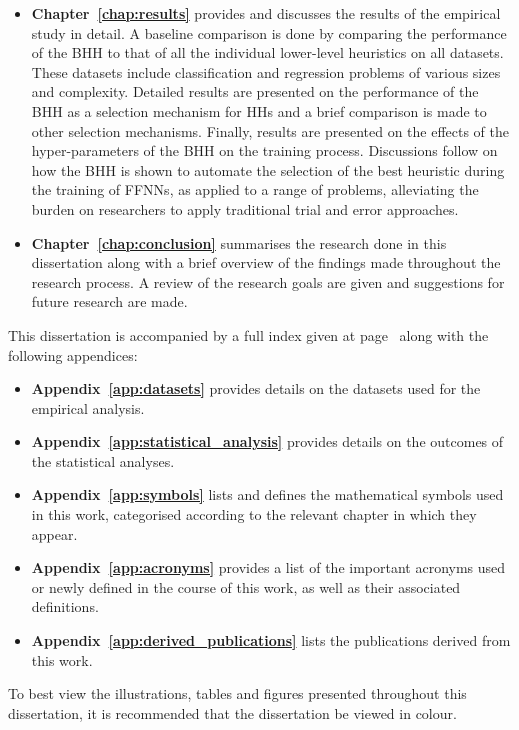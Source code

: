 \begin{itemize}
      \item \textbf{Chapter~\ref{chap:results}} provides and discusses the results of the empirical study in detail. A baseline comparison is done by comparing the performance of the \Acs{BHH} to that of all the individual lower-level heuristics on all datasets. These datasets include classification and regression problems of various sizes and complexity.  Detailed results are presented on the performance of the \Acs{BHH} as a selection mechanism for \acp{HH} and a brief comparison is made to other selection mechanisms. Finally, results are presented on the effects of the hyper-parameters of the \Acs{BHH} on the training process. Discussions follow on how the \Acs{BHH} is shown to automate the selection of the best heuristic during the training of \acp{FFNN}, as applied to a range of problems, alleviating the burden on researchers to apply traditional trial and error approaches.

      \item \textbf{Chapter~\ref{chap:conclusion}} summarises the research done in this dissertation along with a brief overview of the findings made throughout the research process. A review of the research goals are given and suggestions for future research are made.
\end{itemize}

This dissertation is accompanied by a full index given at page~\pageref{index} along with the following appendices:

\begin{itemize}
      \item \textbf{Appendix~\ref{app:datasets}} provides details on the datasets used for the empirical analysis.

      \item \textbf{Appendix~\ref{app:statistical_analysis}} provides details on the outcomes of the statistical analyses.

      \item \textbf{Appendix~\ref{app:symbols}} lists and defines the mathematical symbols used in this work, categorised according to the relevant chapter in which they appear.

      \item \textbf{Appendix~\ref{app:acronyms}} provides a list of the important acronyms used or newly defined in the course of this work, as well as their associated definitions.

      \item \textbf{Appendix~\ref{app:derived_publications}} lists the publications derived from this work.
\end{itemize}

To best view the illustrations, tables and figures presented throughout this dissertation, it is recommended that the dissertation be viewed in colour.
